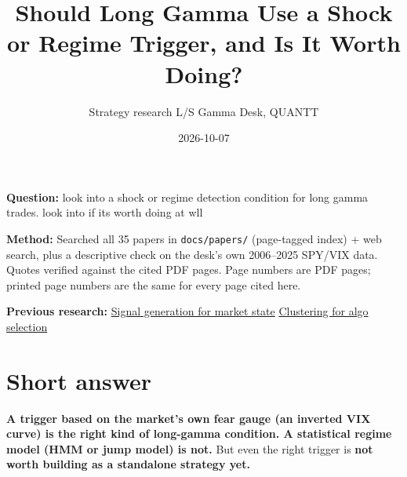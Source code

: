 \documentclass{article}
\title{Should Long Gamma Use a Shock or Regime Trigger, and Is It Worth Doing?}
\author{Strategy research \textperiodcentered{} L/S Gamma Desk, QUANTT}
\date{2026-10-07}
\begin{document}
\maketitle

\textbf{Question:} look into a shock or regime detection condition for long gamma trades. look into if its worth doing at wll

\textbf{Method:} Searched all 35 papers in \texttt{docs/\allowbreak{}papers/\allowbreak{}} (page-tagged index) + web search, plus a descriptive check on the desk's own 2006--2025 SPY/\allowbreak{}VIX data. Quotes verified against the cited PDF pages. Page numbers are PDF pages; printed page numbers are the same for every page cited here.

\textbf{Previous research:} \href{2026-09-29-signal-generation-for-market-state.pdf}{Signal generation for market state} \textperiodcentered{} \href{2026-10-01-clustering-k-means-for-algo-selection.pdf}{Clustering for algo selection}

\section{Short answer}

\textbf{A trigger based on the market's own fear gauge (an inverted VIX curve) is the right kind of long-gamma condition. A statistical regime model (HMM or jump model) is not.} But even the right trigger is \textbf{not worth building as a standalone strategy yet.}
\end{document}
